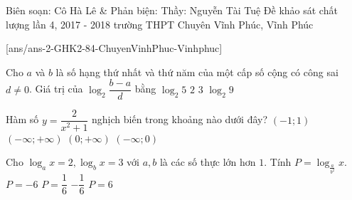 \begin{name}
{Biên soạn: Cô Hà Lê \& Phản biện: Thầy: Nguyễn Tài Tuệ}
{Đề khảo sát chất lượng lần 4, 2017 - 2018 trường THPT Chuyên Vĩnh Phúc, Vĩnh Phúc}
\end{name}
\setcounter{ex}{0}\setcounter{bt}{0}
[ans/ans-2-GHK2-84-ChuyenVinhPhuc-Vinhphuc]
\begin{ex}%
Cho $a$ và $b$ là số hạng thứ nhất và thứ năm của một cấp số cộng có công sai $d \ne 0$. Giá trị của $\log_2{\dfrac{b-a}{d}}$ bằng
\choice
{$\log_2{5}$}
{\True $2$}
{$3$}
{$\log_2{9}$}
\end{ex}

\begin{ex}%
Hàm số $y=\dfrac{2}{x^2+1}$ nghịch biến trong khoảng nào dưới đây?
\choice
{$(-1;1)$}
{$(-\infty;+\infty)$}
{\True $(0;+\infty)$}
{$(-\infty;0)$}
\end{ex}


\begin{ex}%
Cho $\log_a{x}=2, \log_b{x}=3$ với $a,b$ là các số thực lớn hơn $1$. Tính $P=\log_{\frac{a}{b^2}}x$.
\choice
{\True $P=-6$}
{$P=\dfrac{1}{6}$}
{$- \dfrac{1}{6}$}
{$P=6$}
\end{ex}

